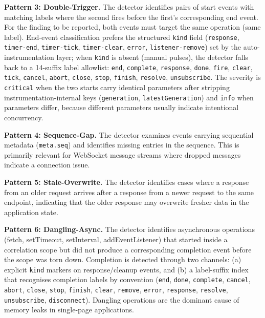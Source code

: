 \documentclass[11pt,a4paper]{article}
\begin{document}
\textbf{Pattern 3: Double-Trigger.} The detector identifies pairs of start events with matching labels where the second fires before the first's corresponding end event. For the finding to be reported, both events must target the same operation (same label). End-event classification prefers the structured \texttt{kind} field (\texttt{response}, \texttt{timer-end}, \texttt{timer-tick}, \texttt{timer-clear}, \texttt{error}, \texttt{listener-remove}) set by the auto-instrumentation layer; when \texttt{kind} is absent (manual pulses), the detector falls back to a 14-suffix label allowlist: \texttt{end}, \texttt{complete}, \texttt{response}, \texttt{done}, \texttt{fire}, \texttt{clear}, \texttt{tick}, \texttt{cancel}, \texttt{abort}, \texttt{close}, \texttt{stop}, \texttt{finish}, \texttt{resolve}, \texttt{unsubscribe}. The severity is \texttt{critical} when the two starts carry identical parameters after stripping instrumentation-internal keys (\texttt{generation}, \texttt{latestGeneration}) and \texttt{info} when parameters differ, because different parameters usually indicate intentional concurrency.

\textbf{Pattern 4: Sequence-Gap.} The detector examines events carrying sequential metadata (\texttt{meta.seq}) and identifies missing entries in the sequence. This is primarily relevant for WebSocket message streams where dropped messages indicate a connection issue.

\textbf{Pattern 5: Stale-Overwrite.} The detector identifies cases where a response from an older request arrives after a response from a newer request to the same endpoint, indicating that the older response may overwrite fresher data in the application state.

\textbf{Pattern 6: Dangling-Async.} The detector identifies asynchronous operations (fetch, setTimeout, setInterval, addEventListener) that started inside a correlation scope but did not produce a corresponding completion event before the scope was torn down. Completion is detected through two channels: (a) explicit \texttt{kind} markers on response/cleanup events, and (b) a label-suffix index that recognises completion labels by convention (\texttt{end}, \texttt{done}, \texttt{complete}, \texttt{cancel}, \texttt{abort}, \texttt{close}, \texttt{stop}, \texttt{finish}, \texttt{clear}, \texttt{remove}, \texttt{error}, \texttt{response}, \texttt{resolve}, \texttt{unsubscribe}, \texttt{disconnect}). Dangling operations are the dominant cause of memory leaks in single-page applications.
\end{document}
